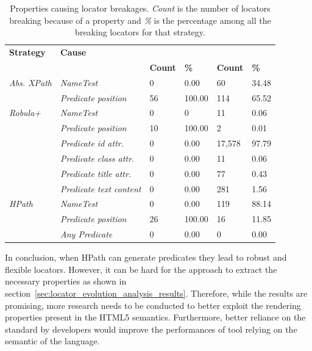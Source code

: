 \begin{table}
\centering
\caption{Properties causing locator breakages. \emph{Count} is the number of locators breaking because of a property and \emph{\%} is the percentage among all the breaking locators for that strategy.}
\label{tab:breakage_cause}
\begin{tabular}{>{\raggedright}m{0.6in}>{\raggedright}m{1.2in}>{\raggedleft}m{0.25in} >{\raggedleft}m{0.4in}>{\raggedleft}m{0.4in} >{\raggedleft}m{0.4in}}
\toprule
\textbf{\scriptsize{Strategy}} & \textbf{\scriptsize{Cause}} & \multicolumn{2}{c}{\textbf{\scriptsize{MISO LIMS}}} & \multicolumn{2}{c}{\textbf{\scriptsize{OpenOLAT}}}\tabularnewline
 &   & \textbf{\scriptsize{Count}} & \textbf{\scriptsize{\%}} & \textbf{\scriptsize{Count}} & \textbf{\scriptsize{\%}}\tabularnewline
\toprule
\scriptsize{\textit{Abs. XPath}} & \scriptsize{\textit{NameTest}} & \scriptsize{0} & \scriptsize{0.00} & \scriptsize{60} & \scriptsize{34.48}\tabularnewline
 & \scriptsize{\textit{Predicate position}} & \scriptsize{56} & \scriptsize{100.00} & \scriptsize{114} & \scriptsize{65.52}\tabularnewline
 \hline
\scriptsize{\textit{Robula+}} & \scriptsize{\textit{NameTest}} & \scriptsize{0} & \scriptsize{0} & \scriptsize{11} & \scriptsize{0.06}\tabularnewline
 & \scriptsize{\textit{Predicate position}} & \scriptsize{10} & \scriptsize{100.00} & \scriptsize{2} & \scriptsize{0.01}\tabularnewline
 & \scriptsize{\textit{Predicate id attr.}} & \scriptsize{0} & \scriptsize{0.00} & \scriptsize{17,578} & \scriptsize{97.79}\tabularnewline
 & \scriptsize{\textit{Predicate class attr.}} & \scriptsize{0} & \scriptsize{0.00} & \scriptsize{11} & \scriptsize{0.06}\tabularnewline
 & \scriptsize{\textit{Predicate title attr.}} & \scriptsize{0} & \scriptsize{0.00} & \scriptsize{77} & \scriptsize{0.43}\tabularnewline
 & \scriptsize{\textit{Predicate text content}} & \scriptsize{0} & \scriptsize{0.00} & \scriptsize{281} & \scriptsize{1.56}\tabularnewline
 \hline
\scriptsize{\textit{HPath}} & \scriptsize{\textit{NameTest}} & \scriptsize{0} & \scriptsize{0.00} & \scriptsize{119} & \scriptsize{88.14}\tabularnewline
 & \scriptsize{\textit{Predicate position}} & \scriptsize{26} & \scriptsize{100.00} & \scriptsize{16} & \scriptsize{11.85}\tabularnewline
 & \scriptsize{\textit{Any Predicate}} & \scriptsize{0} & \scriptsize{0.00} & \scriptsize{0} & \scriptsize{0.00}\tabularnewline
\bottomrule
\end{tabular}
\end{table}

In conclusion, when HPath can generate predicates they lead to robust and flexible locators. However, it can be hard for the approach to extract the necessary properties as shown in section~\ref{sec:locator_evolution_analysis_results}. Therefore, while the results are promising, more research needs to be conducted to better exploit the rendering properties present in the HTML5 semantics. Furthermore, better reliance on the standard by developers would improve the performances of tool relying on the semantic of the language.